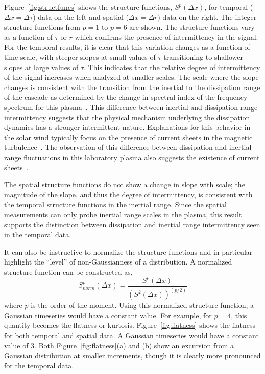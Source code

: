 \documentclass[preprint2]{aastex}
\begin{document}
Figure~\ref{fig:structfuncs} shows the structure functions, $S^{p}(\Delta x)$, for temporal ($\Delta x = \Delta \tau$) data on the left and spatial ($\Delta x = \Delta r$) data on the right. The integer structure functions from $p=1$ to $p=6$ are shown. The structure functions vary as a function of $\tau$ or $r$ which confirms the presence of intermittency in the signal. For the temporal results, it is clear that this variation changes as a function of time scale, with steeper slopes at small values of $\tau$ transitioning to shallower slopes at large values of $\tau$. This indicates that the relative degree of intermittency of the signal increases when analyzed at smaller scales. The scale where the slope changes is consistent with the transition from the inertial to the dissipation range of the cascade as determined by the change in spectral index of the frequency spectrum for this plasma~\citep{schaffner2014c}. This difference between inertial and dissipation range intermittency suggests that the physical mechanism underlying the dissipation dynamics has a stronger intermittent nature. Explanations for this behavior in the solar wind typically focus on the presence of current sheets in the magnetic turbulence~\citep{osman2014}. The observation of this difference between dissipation and inertial range fluctuations in this laboratory plasma also suggests the existence of current sheets~\citep{schaffner2014b}. 

The spatial structure functions do not show a change in slope with scale; the magnitude of the slope, and thus the degree of intermittency, is consistent with the temporal structure functions in the inertial range. Since the spatial measurements can only probe inertial range scales in the plasma, this result supports the distinction between dissipation and inertial range intermittency seen in the temporal data.

It can also be instructive to normalize the structure functions and in particular highlight the ``level'' of non-Gaussianness of a distribution. A normalized structure function can be constructed as,
\begin{equation}
S_{norm}^{p}(\Delta x) = \frac{S^{p}(\Delta x)}{(S^2(\Delta x))^{(p/2)}}
\label{eq:normstructfunc}
\end{equation}
where $p$ is the order of the moment. Using this normalized structure function, a Gaussian timeseries would have a constant value. For example, for $p=4$, this quantity becomes the flatness or kurtosis. Figure~\ref{fig:flatness} shows the flatness for both temporal and spatial data. A Gaussian timeseries would have a constant value of 3. Both Figure~\ref{fig:flatness}(a) and (b) show an excursion from a Gaussian distribution at smaller increments, though it is clearly more pronounced for the temporal data.
\end{document}
